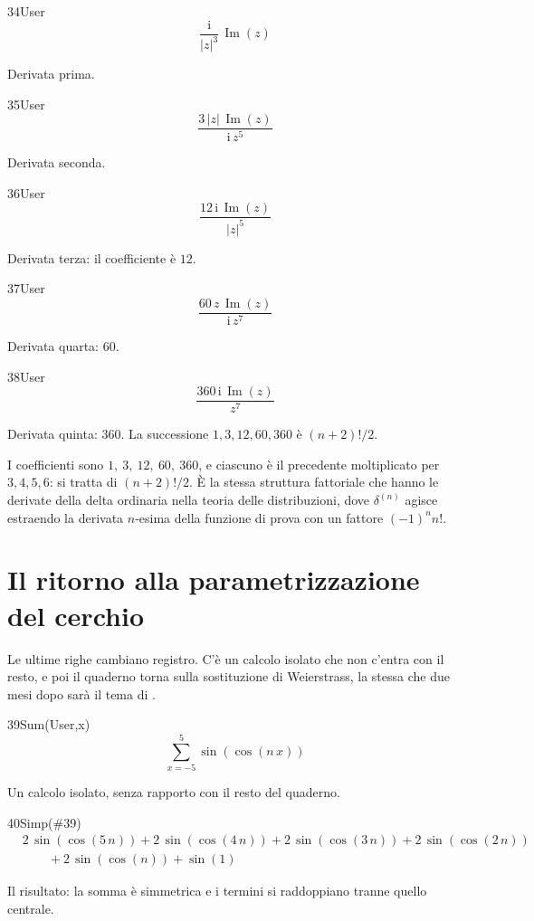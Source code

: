 \begin{espr}{34}{User}{}
\[
\frac{\mathrm{i}}{\left|z\right|^{3}}\, \operatorname{Im}\!\left(z\right)
\]
\end{espr}
Derivata prima.

\begin{espr}{35}{User}{}
\[
\frac{3\, \left|z\right|\, \operatorname{Im}\!\left(z\right)}{\mathrm{i}\, z^{5}}
\]
\end{espr}
Derivata seconda.

\begin{espr}{36}{User}{}
\[
\frac{12\, \mathrm{i}\, \operatorname{Im}\!\left(z\right)}{\left|z\right|^{5}}
\]
\end{espr}
Derivata terza: il coefficiente è $12$.

\begin{espr}{37}{User}{}
\[
\frac{60\, z\, \operatorname{Im}\!\left(z\right)}{\mathrm{i}\, z^{7}}
\]
\end{espr}
Derivata quarta: $60$.

\begin{espr}{38}{User}{}
\[
\frac{360\, \mathrm{i}\, \operatorname{Im}\!\left(z\right)}{z^{7}}
\]
\end{espr}
Derivata quinta: $360$. La successione $1,3,12,60,360$ è $(n+2)!/2$.


I coefficienti sono $1,\ 3,\ 12,\ 60,\ 360$, e ciascuno è il precedente moltiplicato per $3,4,5,6$: si tratta di $(n+2)!/2$. È la stessa struttura fattoriale che hanno le derivate della delta ordinaria nella teoria delle distribuzioni, dove $\delta^{(n)}$ agisce estraendo la derivata $n$-esima della funzione di prova con un fattore $(-1)^n n!$.

\section{Il ritorno alla parametrizzazione del cerchio}

Le ultime righe cambiano registro. C'è un calcolo isolato che non c'entra con il resto, e poi il quaderno torna sulla sostituzione di Weierstrass, la stessa che due mesi dopo sarà il tema di .

\begin{espr}{39}{Sum(User,x)}{}
\[
\sum_{x=-5}^{5} \sin\!\left(\cos\!\left(n\, x\right)\right)
\]
\end{espr}
Un calcolo isolato, senza rapporto con il resto del quaderno.

\begin{espr}{40}{Simp(\#39)}{}
\begin{align*}
& 2\, \sin\!\left(\cos\!\left(5\, n\right)\right) + 2\, \sin\!\left(\cos\!\left(4\, n\right)\right) + 2\, \sin\!\left(\cos\!\left(3\, n\right)\right) + 2\, \sin\!\left(\cos\!\left(2\, n\right)\right) \\
&\qquad + 2\, \sin\!\left(\cos\!\left(n\right)\right) + \sin\!\left(1\right)
\end{align*}
\end{espr}
Il risultato: la somma è simmetrica e i termini si raddoppiano tranne quello centrale.

